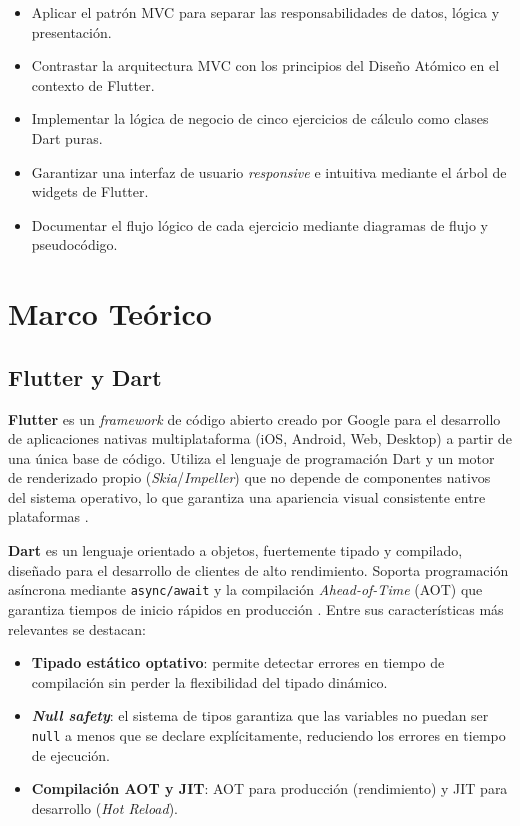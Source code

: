 \documentclass[12pt,a4paper]{article}
\begin{document}
\begin{itemize}
  \item Aplicar el patrón MVC para separar las responsabilidades de datos, lógica y presentación.
  \item Contrastar la arquitectura MVC con los principios del Diseño Atómico en el contexto de Flutter.
  \item Implementar la lógica de negocio de cinco ejercicios de cálculo como clases Dart puras.
  \item Garantizar una interfaz de usuario \textit{responsive} e intuitiva mediante el árbol de widgets de Flutter.
  \item Documentar el flujo lógico de cada ejercicio mediante diagramas de flujo y pseudocódigo.
\end{itemize}

\section{Marco Teórico}

\subsection{Flutter y Dart}

\textbf{Flutter} es un \textit{framework} de código abierto creado por Google para el desarrollo de aplicaciones nativas multiplataforma (iOS, Android, Web, Desktop) a partir de una única base de código. Utiliza el lenguaje de programación Dart y un motor de renderizado propio (\textit{Skia}/\textit{Impeller}) que no depende de componentes nativos del sistema operativo, lo que garantiza una apariencia visual consistente entre plataformas \cite{flutter2024}.

\textbf{Dart} es un lenguaje orientado a objetos, fuertemente tipado y compilado, diseñado para el desarrollo de clientes de alto rendimiento. Soporta programación asíncrona mediante \texttt{async/await} y la compilación \textit{Ahead-of-Time} (AOT) que garantiza tiempos de inicio rápidos en producción \cite{dart2024}. Entre sus características más relevantes se destacan:

\begin{itemize}
  \item \textbf{Tipado estático optativo}: permite detectar errores en tiempo de compilación sin perder la flexibilidad del tipado dinámico.
  \item \textbf{\textit{Null safety}}: el sistema de tipos garantiza que las variables no puedan ser \texttt{null} a menos que se declare explícitamente, reduciendo los errores en tiempo de ejecución.
  \item \textbf{Compilación AOT y JIT}: AOT para producción (rendimiento) y JIT para desarrollo (\textit{Hot Reload}).
\end{itemize}
\end{document}
